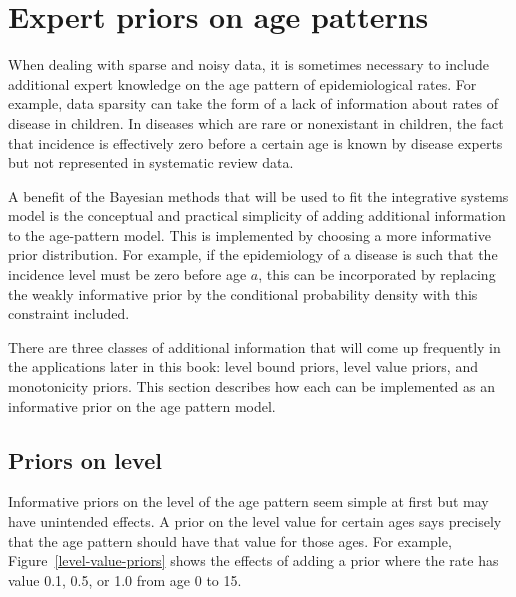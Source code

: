 \chapter{Expert priors on age patterns}

When dealing with sparse and noisy data, it is sometimes necessary to
include additional expert knowledge on the age pattern of
epidemiological rates.  For example, data sparsity can take the form
of a lack of information about rates of disease in children.  In
diseases which are rare or nonexistant in children, the fact that incidence is
effectively zero before a certain age is known by disease experts but
not represented in systematic review data.

A benefit of the Bayesian methods that will be used to fit the
integrative systems model is the conceptual and practical simplicity
of adding additional information to the age-pattern model.  This is
implemented by choosing a more informative prior distribution.  For
example, if the epidemiology of a disease is such that the incidence
level must be zero before age $a$, this can be incorporated by
replacing the weakly informative prior by the conditional probability
density with this constraint included.

There are three classes of additional information that will come up
frequently in the applications later in this book: level bound priors,
level value priors, and monotonicity priors. This section describes
how each can be implemented as an informative prior on the age pattern
model.


\section{Priors on level}

Informative priors on the level of the age pattern seem simple at
first but may have unintended effects.  A prior on the level value
for certain ages says precisely that the age pattern should have that
value for those ages.  For example, Figure~\ref{level-value-priors} shows
the effects of adding a prior where the rate has value 0.1, 0.5, or 1.0
from age 0 to 15.


